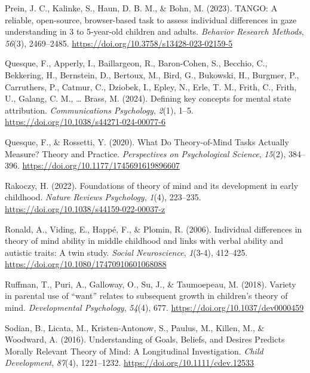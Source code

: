 \documentclass[
]{scrbook}
\newlength{\cslhangindent}
\newenvironment{CSLReferences}[2] %
 {\begin{list}{}{%
  \setlength{\itemindent}{0pt}
  \setlength{\leftmargin}{0pt}
  \setlength{\parsep}{0pt}
  \ifodd #1
   \setlength{\leftmargin}{\cslhangindent}
   \setlength{\itemindent}{-1\cslhangindent}
  \fi
  \setlength{\itemsep}{#2\baselineskip}}}
 {\end{list}}
\begin{document}
\begin{CSLReferences}{1}{0}
Prein, J. C., Kalinke, S., Haun, D. B. M., \& Bohn, M. (2023). {TANGO}: {A} reliable, open-source, browser-based task to assess individual differences in gaze understanding in 3 to 5-year-old children and adults. \emph{Behavior Research Methods}, \emph{56}(3), 2469--2485. \url{https://doi.org/10.3758/s13428-023-02159-5}

Quesque, F., Apperly, I., Baillargeon, R., Baron-Cohen, S., Becchio, C., Bekkering, H., Bernstein, D., Bertoux, M., Bird, G., Bukowski, H., Burgmer, P., Carruthers, P., Catmur, C., Dziobek, I., Epley, N., Erle, T. M., Frith, C., Frith, U., Galang, C. M., \ldots{} Brass, M. (2024). Defining key concepts for mental state attribution. \emph{Communications Psychology}, \emph{2}(1), 1--5. \url{https://doi.org/10.1038/s44271-024-00077-6}

Quesque, F., \& Rossetti, Y. (2020). What {Do Theory-of-Mind Tasks Actually Measure}? {Theory} and {Practice}. \emph{Perspectives on Psychological Science}, \emph{15}(2), 384--396. \url{https://doi.org/10.1177/1745691619896607}

Rakoczy, H. (2022). Foundations of theory of mind and its development in early childhood. \emph{Nature Reviews Psychology}, \emph{1}(4), 223--235. \url{https://doi.org/10.1038/s44159-022-00037-z}

Ronald, A., Viding, E., Happé, F., \& Plomin, R. (2006). Individual differences in theory of mind ability in middle childhood and links with verbal ability and autistic traits: {A} twin study. \emph{Social Neuroscience}, \emph{1}(3-4), 412--425. \url{https://doi.org/10.1080/17470910601068088}

Ruffman, T., Puri, A., Galloway, O., Su, J., \& Taumoepeau, M. (2018). Variety in parental use of {``want''} relates to subsequent growth in children's theory of mind. \emph{Developmental Psychology}, \emph{54}(4), 677. \url{https://doi.org/10.1037/dev0000459}

Sodian, B., Licata, M., Kristen-Antonow, S., Paulus, M., Killen, M., \& Woodward, A. (2016). Understanding of {Goals}, {Beliefs}, and {Desires Predicts Morally Relevant Theory} of {Mind}: {A Longitudinal Investigation}. \emph{Child Development}, \emph{87}(4), 1221--1232. \url{https://doi.org/10.1111/cdev.12533}


\end{CSLReferences}
\end{document}
